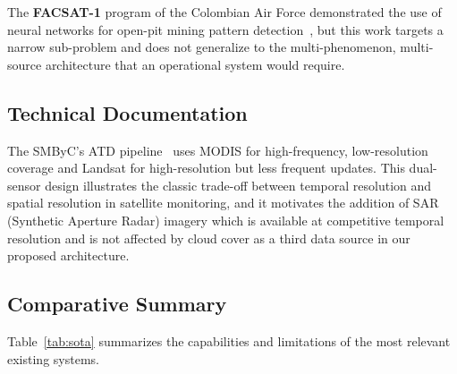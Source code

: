 \documentclass{article}
\begin{document}
The \textbf{FACSAT-1} program of the Colombian Air Force demonstrated the use
of neural networks for open-pit mining pattern detection~\cite{facsat1}, but
this work targets a narrow sub-problem and does not generalize to the
multi-phenomenon, multi-source architecture that an operational system
would require.

\subsection{Technical Documentation}

The SMByC's ATD pipeline~\cite{smbyc_atd_github} uses MODIS for high-frequency,
low-resolution coverage and Landsat for high-resolution but less frequent updates.
This dual-sensor design illustrates the classic trade-off between temporal
resolution and spatial resolution in satellite monitoring, and it motivates the
addition of SAR (Synthetic Aperture Radar) imagery which is available at
competitive temporal resolution and is not affected by cloud cover as a third
data source in our proposed architecture.

\subsection{Comparative Summary}

Table~\ref{tab:sota} summarizes the capabilities and limitations of the most
relevant existing systems.

\begin{table}[ht]
\centering
\caption{Comparison of existing satellite monitoring systems}
\label{tab:sota}
\end{table}
\end{document}
